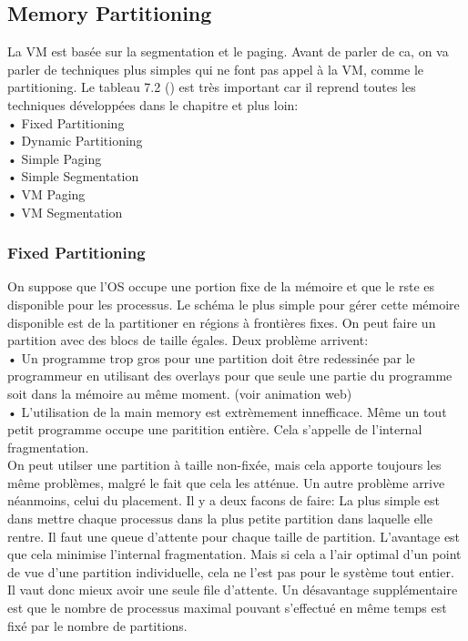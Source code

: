 \subsection{Memory Partitioning}
La VM est basée sur la segmentation et le paging. Avant de parler de ca, on va parler de techniques plus simples qui ne font pas appel à la VM, comme le partitioning. Le tableau 7.2 (\cite[p.~311]{stallings}) est très important car il reprend toutes les techniques développées dans le chapitre et plus loin: \\
• Fixed Partitioning \\
• Dynamic Partitioning \\
• Simple Paging \\
• Simple Segmentation \\
• VM Paging \\
• VM Segmentation \\
\subsubsection{Fixed Partitioning}
On suppose que l'OS occupe une portion fixe de la mémoire et que le rste es disponible pour les processus. Le schéma le plus simple pour gérer cette mémoire disponible est de la partitioner en régions à frontières fixes.
On peut faire un partition avec des blocs de taille égales. Deux problème arrivent: \\
• Un programme trop gros pour une partition doit être redessinée par le programmeur en utilisant des overlays pour que seule une partie du programme soit dans la mémoire au même moment. (voir animation web) \\
• L'utilisation de la main memory est extrèmement innefficace. Même un tout petit programme occupe une paritition entière. Cela s'appelle de l'internal fragmentation. \\
On peut utilser une partition à taille non-fixée, mais cela apporte toujours les même problèmes, malgré le fait que cela les atténue. Un autre problème arrive néanmoins, celui du placement. Il y a deux facons de faire: La plus simple est dans mettre chaque processus dans la plus petite partition dans laquelle elle rentre. Il faut une queue d'attente pour chaque taille de partition. L'avantage est que cela minimise l'internal fragmentation. Mais si cela a l'air optimal d'un point de vue d'une partition individuelle, cela ne l'est pas pour le système tout entier. Il vaut donc mieux avoir une seule file d'attente. Un désavantage supplémentaire est que le nombre de processus maximal pouvant s'effectué en même temps est fixé par le nombre de partitions.
